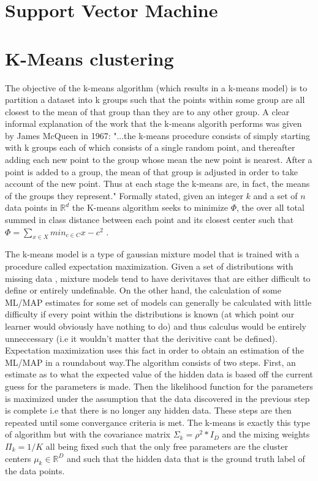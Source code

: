 \section{Support Vector Machine}


\section{K-Means clustering}
The objective of the k-means algorithm (which results in a k-means model) is to partition
a dataset into k groups such that the points within some group are all closest to
the mean of that group than they are to any other group. A clear
informal explanation of the work that the k-means algorith performs
was given by James McQueen in 1967: "...the k-means procedure
consists of simply starting with k groups each of which consists of a
single random point, and thereafter adding each new point to the
group whose mean the new point is nearest. After a point is added to
a group, the mean of that group is adjusted in order to take account
of the new point. Thus at each stage the k-means are, in fact, the
means of the groups they represent." \cite{MacQueen} Formally stated,
given an integer $k$ and a set of $n$ data points in
$\mathbb{R}^{d}$ the K-means algorithm seeks to minimize  $\Phi$, the
over all total summed in class distance between each point and its
closest center such that $\mathbb \Phi = \sum_{x \in X} min_{c \in C}{x-c^{2}}$
\cite{Arthur}.

The k-means model is a type of gaussian mixture model that is trained with a procedure
called expectation maximization. Given a set of distributions with missing data
, mixture models tend to have derivitaves that are either difficult to define
or entirely undefinable. On the other hand, the calculation of some ML/MAP
estimates for some set of models can generally be calculated with little
difficulty if every point within the distributions is known (at which point our
learner would obviously have nothing to do) and thus calculus would be entirely
unneccessary (i.e it wouldn't matter that the derivitive cant be defined).
Expectation maximization uses this fact in order to obtain an estimation of the
ML/MAP in a roundabout way.The algorithm consists of two steps. First, an estimate as
to what the expected value of the hidden data is based off the current guess for the
parameters is made. Then the likelihood function for the parameters is maximized under
the assumption that the data discovered in the previous step is complete i.e that there
is no longer any hidden data. These steps are then repeated until some convergance criteria
is met. The k-means is exactly this type of algorithm but with the covariance matrix
$\Sigma_{k} = \rho^{2}*I_{D}$ and the mixing weights $\Pi_{k} = 1/K$ all being fixed such
that the only free parameters are the cluster centers $\mu_{k} \in \mathbb{R}^{D}$
and such that the hidden data that is the ground truth label of the data points.
